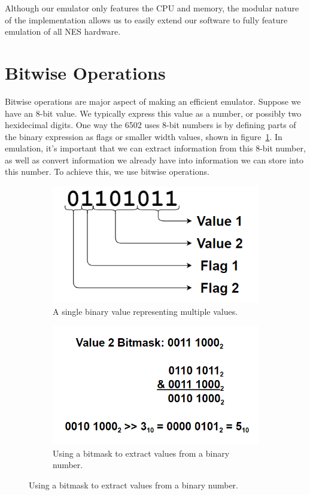 \documentclass[12pt]{article}
\begin{document}
Although our emulator only features the CPU and memory, the modular nature of the implementation allows
us to easily extend our software to fully feature emulation of all NES hardware.

\section{Bitwise Operations}
\label{sec:bitwise}

Bitwise operations are major aspect of making an efficient emulator. Suppose we have an 8-bit value.
We typically express this value as a number, or possibly two hexidecimal digits. One way the 6502 uses
8-bit numbers is by defining parts of the binary expression as flags or smaller width values, shown in figure~\ref{fig:figure1}.
In emulation, it's important that we can extract information from this 8-bit number, as well as convert
information we already have into information we can store into this number. To achieve this, we use
bitwise operations.

\begin{figure}[b!]
	\centering
	\begin{subfigure}[t]{0.5\linewidth}
		\includegraphics[bb=0 0 462 262]{figure1.PNG}
		\caption{A single binary value representing multiple values.}
		\label{fig:figure1}
	\end{subfigure}
	\begin{subfigure}[t]{0.4\linewidth}
		\includegraphics[bb=0 0 554 320]{figure2.PNG}
		\caption{Using a bitmask to extract values from a binary number.}
		\label{fig:figure2}
	\end{subfigure}
\end{figure}
\end{document}
